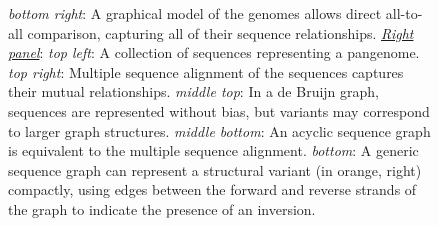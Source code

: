 \begin{figure}[p]
{    \textit{bottom right}: A graphical model of the genomes allows direct all-to-all comparison, capturing all of their sequence relationships.
    \underline{\emph{Right panel}}:
    \textit{top left}: A collection of sequences representing a pangenome.
    \textit{top right}: Multiple sequence alignment of the sequences captures their mutual relationships.
    \textit{middle top}: In a de Bruijn graph, sequences are represented without bias, but variants may correspond to larger graph structures.
    \textit{middle bottom}: An acyclic sequence graph is equivalent to the multiple sequence alignment.
    \textit{bottom}: A generic sequence graph can represent a structural variant (in orange, right) compactly, using edges between the forward and reverse strands of the graph to indicate the presence of an inversion.
  }
\end{figure}

